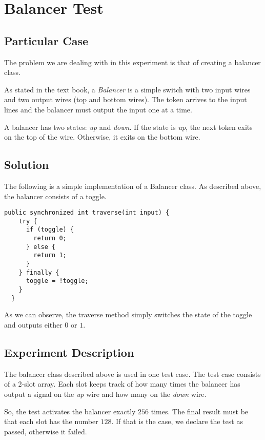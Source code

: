 \section{\textbf{Balancer Test}}
\subsection{Particular Case}
\par
The problem we are dealing with in this experiment is that of creating a 
balancer class.
\par
As stated in the text book, a \textit{Balancer} is a simple switch with two
input wires and two output wires (top and bottom wires). The token arrives to
the input lines and the balancer must output the input one at a time.
\par
A balancer has two states: \textit{up} and \textit{down}. If the state is
\textit{up}, the next token exits on the top of the wire. Otherwise, it exits
on the bottom wire.
\par
\subsection{Solution}
\par
The following is a simple implementation of a Balancer
class. As described above, the balancer consists of a
toggle. 
\par
\hfill
\begin{lstlisting}[style=numbers]
  public synchronized int traverse(int input) {
    try {
      if (toggle) {
        return 0;
      } else {
        return 1;
      }
    } finally {
      toggle = !toggle;
    }
  }
\end{lstlisting}
\hfill
\par
As we can observe, the traverse method simply switches the state of the toggle
and outputs either $0$ or $1$. 
\subsection{Experiment Description}
\par
The balancer class described above is used in one test case. The test case
consists of a 2-slot array. Each slot keeps track of how many times the
balancer has output a signal on the \textit{up} wire and how many on the
\textit{down} wire. 
\par
So, the test activates the balancer exactly $256$ times. The final result must be that each slot has the number $128$. If that is the case, we declare the test as passed, otherwise it failed.
\par
